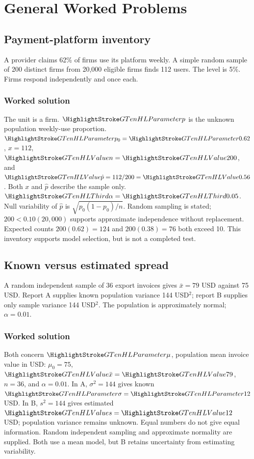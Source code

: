 \section{General Worked Problems}\label{sec:general-worked}
\subsection{Payment-platform inventory}\label{prob:inventory}
A provider claims 62\% of firms use its platform weekly. A simple random sample of 200 distinct firms from 20,000 eligible firms finds 112 users. The level is 5\%. Firms respond independently and once each.
\subsubsection*{Worked solution}\label{sol:inventory}
The unit is a firm. $\Pop{p}$ is the unknown population weekly-use proportion. $\Pop{p_0}=\Pop{0.62}$, $x=112$, $\Obs{n}=\Obs{200}$, and $\Obs{\hat p}=112/200=\Obs{0.56}$. Both $x$ and $\hat p$ describe the sample only. $\Design{\alpha}=\Design{0.05}$. Null variability of $\hat p$ is $\sqrt{p_0(1-p_0)/n}$. Random sampling is stated; $200<0.10(20{,}000)$ supports approximate independence without replacement. Expected counts $200(0.62)=124$ and $200(0.38)=76$ both exceed 10. This inventory supports model selection, but is not a completed test.
\subsection{Known versus estimated spread}\label{prob:spread}
A random independent sample of 36 export invoices gives $\bar x=79$ USD against 75 USD. Report A supplies known population variance 144 USD$^2$; report B supplies only sample variance 144 USD$^2$. The population is approximately normal; $\alpha=0.01$.
\subsubsection*{Worked solution}\label{sol:spread}
Both concern $\Pop{\mu}$, population mean invoice value in USD: $\mu_0=75$, $\Obs{\bar x}=\Obs{79}$, $n=36$, and $\alpha=0.01$. In A, $\sigma^2=144$ gives known $\Pop{\sigma}=\Pop{12}$ USD. In B, $s^2=144$ gives estimated $\Obs{s}=\Obs{12}$ USD; population variance remains unknown. Equal numbers do not give equal information. Random independent sampling and approximate normality are supplied. Both use a mean model, but B retains uncertainty from estimating variability.
